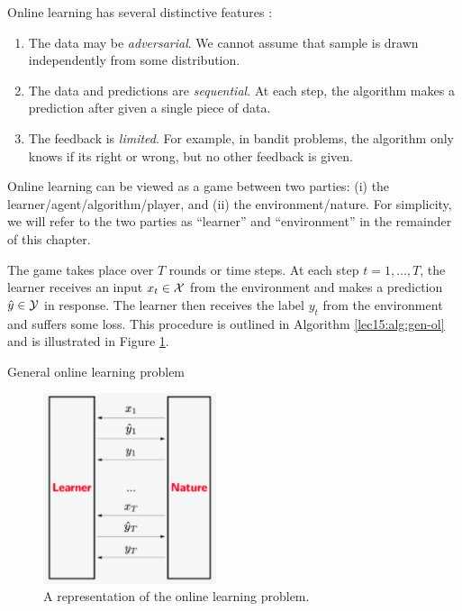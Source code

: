 Online learning has several distinctive features \cite{percynotes}:
\begin{enumerate}
\item The data may be \textit{adversarial}. We cannot assume that sample is drawn independently from some distribution.    
\item The data and predictions are \textit{sequential}. At each step, the algorithm makes a prediction after given a single piece of data.
\item The feedback is \textit{limited}. For example, in bandit problems, the algorithm only knows if its right or wrong, but no other feedback is given. 
\end{enumerate}

Online learning can be viewed as a game between two parties: (i) the learner/agent/algorithm/player, and (ii) the environment/nature. For simplicity, we will refer to the two parties as ``learner'' and ``environment'' in the remainder of this chapter.

The game takes place over $T$ rounds or time steps. At each step $t = 1, \dots, T$, the learner receives an input $x_t \in \mathcal X$ from the environment and makes a prediction $\hat{y} \in \mathcal Y$ in response. The learner then receives the label $y_t$ from the environment and suffers some loss. This procedure is outlined in Algorithm \ref{lec15:alg:gen-ol} and is illustrated in Figure \ref{lec15:fig:OLgame}.

    \begin{algorithm}[h]\label{lec15:alg:gen-ol}
        \caption{General online learning problem}
    \end{algorithm}

\begin{figure}[ht]
    \centering
    \includegraphics[width=2in]{figures/OLupdated.png}
    \caption{A representation of the online learning problem.}
    \label{lec15:fig:OLgame}
\end{figure}

